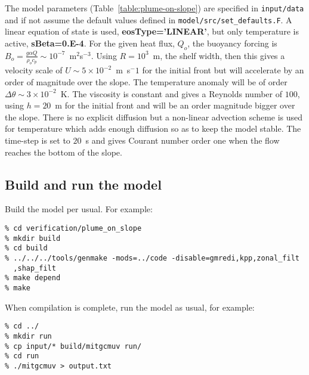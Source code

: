 The model parameters (Table~\ref{table:plume-on-slope}) are specified
in {\tt input/data} and if not assume the default values defined in
{\tt model/src/set\_defaults.F}. A linear equation of state is used,
{\bf eosType='LINEAR'}, but only temperature is active, {\bf
sBeta=0.E-4}. For the given heat flux, $Q_o$, the buoyancy forcing is
$B_o = \frac{g \alpha Q}{\rho_o c_p} \sim
10^{-7}$~m$^2$s$^{-3}$. Using $R=10^3$~m, the shelf width, then this
gives a velocity scale of $U\sim 5 \times 10^{-2}$~m~s$^-1$ for the
initial front but will accelerate by an order of magnitude over the
slope. The temperature anomaly will be of order $\Delta \theta \sim 3
\times 10^{-2}$~K.  The viscosity is constant and gives a Reynolds
number of $100$, using $h=20$~m for the initial front and will be an
order magnitude bigger over the slope. There is no explicit diffusion
but a non-linear advection scheme is used for temperature which adds
enough diffusion so as to keep the model stable. The time-step is set
to $20$~s and gives Courant number order one when the flow reaches the
bottom of the slope.

\subsection{Build and run the model}

Build the model per usual. For example:
\begin{verbatim}
% cd verification/plume_on_slope
% mkdir build
% cd build
% ../../../tools/genmake -mods=../code -disable=gmredi,kpp,zonal_filt
  ,shap_filt
% make depend
% make
\end{verbatim}

When compilation is complete, run the model as usual, for example:
\begin{verbatim}
% cd ../
% mkdir run
% cp input/* build/mitgcmuv run/
% cd run
% ./mitgcmuv > output.txt
\end{verbatim}
